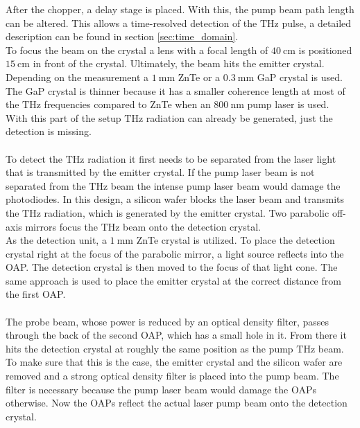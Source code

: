 After the chopper, a delay stage is placed.
With this, the pump beam path length can be altered.
This allows a time-resolved detection of the $\si{\tera\hertz}$ pulse, a detailed description can be found in section \ref{sec:time_domain}.
\\
To focus the beam on the crystal a lens with a focal length of $\SI{40}{\centi\meter}$ is positioned $\SI{15}{\centi\meter}$ in front of the crystal.
Ultimately, the beam hits the emitter crystal.
Depending on the measurement a $\SI{1}{\milli\meter}$ ZnTe or a $\SI{0.3}{\milli\meter}$ GaP crystal is used.
The GaP crystal is thinner because it has a smaller coherence length at most of the $\si{\tera\hertz}$ frequencies compared to ZnTe when an $\SI{800}{\nano\meter}$ pump laser is used.
\\
With this part of the setup $\si{\tera\hertz}$ radiation can already be generated, just the detection is missing.
\\\\
To detect the $\si{\tera\hertz}$ radiation it first needs to be separated from the laser light that is transmitted by the emitter crystal.
If the pump laser beam is not separated from the $\si{\tera\hertz}$ beam the intense pump laser beam would damage the photodiodes.
In this design, a silicon wafer blocks the laser beam and transmits the $\si{\tera\hertz}$ radiation, which is generated by the emitter crystal.
Two parabolic off-axis mirrors focus the $\si{\tera\hertz}$ beam onto the detection crystal.
\\
As the detection unit, a $\SI{1}{\milli\meter}$ ZnTe crystal is utilized.
To place the detection crystal right at the focus of the parabolic mirror, a light source reflects into the OAP.
The detection crystal is then moved to the focus of that light cone.
The same approach is used to place the emitter crystal at the correct distance from the first OAP.
\\\\
The probe beam, whose power is reduced by an optical density filter, passes through the back of the second OAP, which has a small hole in it.
From there it hits the detection crystal at roughly the same position as the pump $\si{\tera\hertz}$ beam.
\\
To make sure that this is the case, the emitter crystal and the silicon wafer are removed and a strong optical density filter is placed into the pump beam.
The filter is necessary because the pump laser beam would damage the OAPs otherwise.
Now the OAPs reflect the actual laser pump beam onto the detection crystal.
